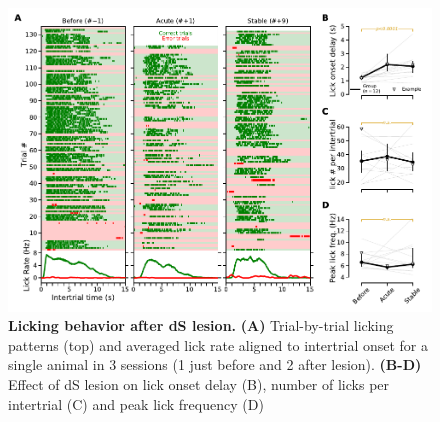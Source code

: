 \begin{figure}[h!]
  \begin{center}
    \includegraphics[width=1\linewidth]{Figures/Lick.pdf}
    \caption
    {\textbf{Licking behavior after dS lesion.}
	\textbf{(A)} Trial-by-trial licking patterns (top) and averaged lick rate aligned to intertrial onset for a single animal in 3 sessions (1 just before and 2 after lesion). 
	\textbf{(B-D)} Effect of dS lesion on lick onset delay (B), number of licks per intertrial (C) and peak lick frequency (D)
	}
	\label{sfig5}
  \end{center}
\end{figure}

